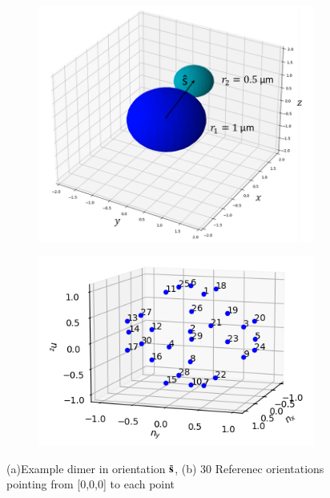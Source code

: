 \documentclass[final,  3p]{elsarticle}
\begin{document}
\begin{figure}[h]
	\centering
	\begin{subfigure}{0.49\textwidth}
		\subcaption{}
		\includegraphics[width=\textwidth]{./Images/fig2a.png}
	\end{subfigure}
	\begin{subfigure}{0.49\textwidth}
		\subcaption{}
		\includegraphics[width=\textwidth]{./Images/fig2b.png}
	\end{subfigure}
	\caption{(a)Example dimer in orientation $\bar{\bf s}$, (b) 30 Referenec orientations pointing from [0,0,0] to each point}
	\label{fig:dimer}
\end{figure}
\end{document}
